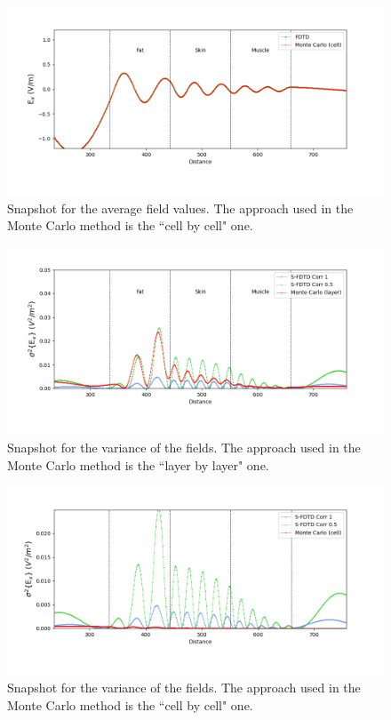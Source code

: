 \documentclass[12pt, oneside]{book}
\begin{document}
\begin{figure}
\centering
\includegraphics[scale=0.6]{Excell(14).png}
\caption{Snapshot for the average field values. The approach used in the Monte Carlo method is the ``cell by cell" one.}\label{Excell(14)}
\end{figure}


\begin{figure}
\centering
\includegraphics[scale=0.6]{Vaexlayer(13).png}
\caption{Snapshot for the variance of the fields. The approach used in the Monte Carlo method is the ``layer by layer" one.}\label{VarExlayer(13)}
\end{figure}


\begin{figure}
\centering
\includegraphics[scale=0.6]{VarExcell(15).png}
\caption{Snapshot for the variance of the fields. The approach used in the Monte Carlo method is the ``cell by cell" one.}\label{VarExcell(15)}
\end{figure}
\end{document}
